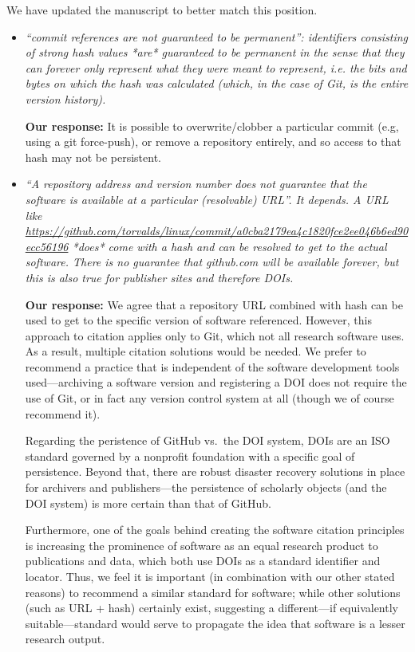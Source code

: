 \documentclass{article}
\begin{document}
\begin{enumerate}
We have updated the manuscript to better match this position.

\begin{itemize}

\item \emph{``commit references are not guaranteed to be permanent'':
identifiers consisting of strong hash values *are* guaranteed to be permanent
in the sense that they can forever only represent what they were meant to
represent, i.e. the bits and bytes on which the hash was calculated (which, in
the case of Git, is the entire version history).}

\textbf{Our response:}
It is possible to overwrite\slash clobber a particular commit (e.g, using a
git force-push), or remove a repository entirely, and so access to that hash
may not be persistent.

\item \emph{``A repository address and version number does not guarantee that
the software is available at a particular (resolvable) URL''. It depends. A URL
like \url{https://github.com/torvalds/linux/commit/a0cba2179ea4c1820fce2ee046b6ed90ecc56196}
*does* come with a hash and can be resolved to get to the actual software.
There is no guarantee that github.com will be available forever, but this is
also true for publisher sites and therefore DOIs.}

\textbf{Our response:}
We agree that a repository URL combined with hash can be used to get to
the specific version of software referenced. However, this approach to citation
applies only to Git, which not all research software uses. As a result, multiple
citation solutions would be needed. We prefer to recommend a practice that is
independent of the software development tools used---archiving a software
version and registering a DOI does not require the use of Git, or in fact any
version control system at all (though we of course recommend it).

Regarding the peristence of GitHub vs.\ the DOI system, DOIs are an ISO standard
governed by a nonprofit foundation with a specific goal of persistence. Beyond
that, there are robust disaster recovery solutions in place for archivers and
publishers---the persistence of scholarly objects (and the DOI system) is
more certain than that of GitHub.

Furthermore, one of the goals behind creating the software citation principles
is increasing the prominence of software as an equal research product to
publications and data, which both use DOIs as a standard identifier and locator.
Thus, we feel it is important (in combination with our other stated reasons) to
recommend a similar standard for software; while other solutions (such as URL +
hash) certainly exist, suggesting a different---if equivalently suitable---standard
would serve to propagate the idea that software is a lesser research output.


\end{itemize}
\end{enumerate}
\end{document}
